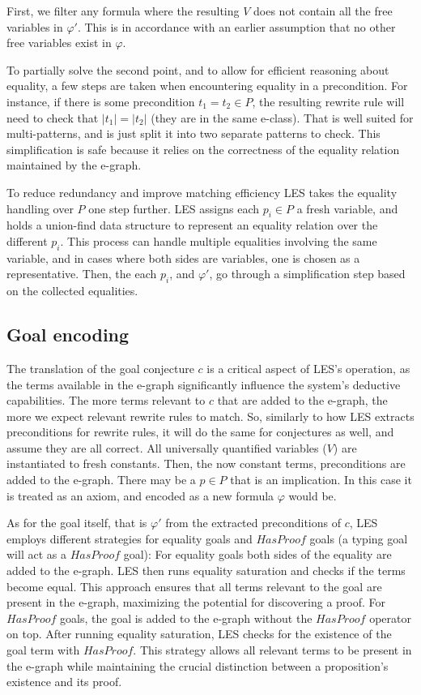 First, we filter any formula where the resulting $V$ does not contain all the free variables in $\varphi'$.
This is in accordance with an earlier assumption that no other free variables exist in $\varphi$.

To partially solve the second point, and to allow for efficient reasoning about equality, a few steps are taken when encountering equality in a precondition.
For instance, if there is some precondition $t_1 = t_2 \in P$, the resulting rewrite rule will need to check that $|t_1| = |t_2|$ (they are in the same e-class).
That is well suited for multi-patterns, and is just split it into two separate patterns to check.
This simplification is safe because it relies on the correctness of the equality relation maintained by the e-graph.

To reduce redundancy and improve matching efficiency LES takes the equality handling over $P$ one step further.
LES assigns each $p_i \in P$ a fresh variable, and holds a union-find data structure to represent an equality relation over the different $p_i$.
This process can handle multiple equalities involving the same variable, and in cases where both sides are variables, one is chosen as a representative.
Then, the each $p_i$, and $\varphi'$, go through a simplification step based on the collected equalities.

\subsection{Goal encoding}
\label{translation:les:goal}

The translation of the goal conjecture $c$ is a critical aspect of LES's operation, as the terms available in the e-graph significantly influence the system's deductive capabilities.
The more terms relevant to $c$ that are added to the e-graph, the more we expect relevant rewrite rules to match.
So, similarly to how LES extracts preconditions for rewrite rules, it will do the same for conjectures as well, and assume they are all correct.
All universally quantified variables ($V$) are instantiated to fresh constants.
Then, the now constant terms, preconditions are added to the e-graph.
There may be a $p \in P$ that is an implication.
In this case it is treated as an axiom, and encoded as a new formula $\varphi$ would be.

As for the goal itself, that is $\varphi'$ from the extracted preconditions of $c$, LES employs different strategies for equality goals and $HasProof$ goals (a typing goal will act as a $HasProof$ goal):
For equality goals both sides of the equality are added to the e-graph. 
LES then runs equality saturation and checks if the terms become equal. 
This approach ensures that all terms relevant to the goal are present in the e-graph, maximizing the potential for discovering a proof.
For $HasProof$ goals, the goal is added to the e-graph without the $HasProof$ operator on top. 
After running equality saturation, LES checks for the existence of the goal term with $HasProof$. 
This strategy allows all relevant terms to be present in the e-graph while maintaining the crucial distinction between a proposition's existence and its proof.